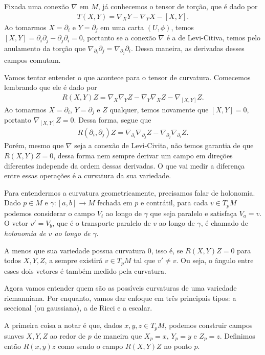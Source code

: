 \documentclass{article}
\begin{document}
Fixada uma conexão $\nabla$ em $M$, já conhecemos o tensor de torção, que é dado por \begin{align}
    T(X,Y) = \nabla_X Y - \nabla_Y X - [X,Y].
\end{align} Ao tomarmos $X = \partial_i$ e $Y = \partial_j$ em uma carta $(U, \phi)$, temos $[X,Y] = \partial_i \partial_j - \partial_j \partial_i = 0$, portanto se a conexão $\nabla$ é a de Levi-Citiva, temos pelo anulamento da torção que $\nabla_{\partial_i} \partial_j = \nabla_{\partial_j} \partial_i$. Dessa maneira, as derivadas desses campos comutam.

Vamos tentar entender o que acontece para o tensor de curvatura. Comecemos lembrando que ele é dado por \begin{align}
    R(X,Y)Z = \nabla_X\nabla_Y Z - \nabla_Y\nabla_X Z - \nabla_{[X,Y]}Z.
\end{align} Ao tomarmos $X = \partial_i$, $Y = \partial_j$ e $Z$ qualquer, temos novamente que $[X,Y] = 0$, portanto $\nabla_{[X,Y]}Z = 0$. Dessa forma, segue que \begin{align}
    R(\partial_i, \partial_j)Z = \nabla_{\partial_i}\nabla_{\partial_j}Z - \nabla_{\partial_j}\nabla_{\partial_i}Z.
\end{align} Porém, mesmo que $\nabla$ seja a conexão de Levi-Civita, não temos garantia de que $R(X,Y)Z = 0$, dessa forma nem sempre derivar um campo em direções diferentes independe da ordem dessas derivadas. O que vai medir a diferença entre essas operações é a curvatura da sua variedade.

Para entendermos a curvatura geometricamente, precisamos falar de holonomia. Dado $p \in M$ e $\gamma \colon [a,b] \to M$ fechada em $p$ e contrátil, para cada $v \in T_pM$ podemos considerar o campo $V_t$ ao longo de $\gamma$ que seja paralelo e satisfaça $V_a = v$. O vetor $v' = V_b$, que é o transporte paralelo de $v$ ao longo de $\gamma$, é chamado de \textit{holonomia de $v$ ao longo de $\gamma$}.

A menos que sua variedade possua curvatura $0$, isso é, se $R(X,Y)Z = 0$ para todos $X, Y, Z$, a sempre existirá $v \in T_pM$ tal que $v' \neq v$. Ou seja, o ângulo entre esses dois vetores é também medido pela curvatura.

Agora vamos entender quem são as possíveis curvaturas de uma variedade riemanniana. Por enquanto, vamos dar enfoque em três principais tipos: a seccional (ou gaussiana), a de Ricci e a escalar.

A primeira coisa a notar é que, dados $x, y, z \in T_pM$, podemos construir campos suaves $X, Y, Z$ ao redor de $p$ de maneira que $X_p = x$, $Y_p = y$ e $Z_p = z$. Definimos então $R(x,y)z$ como sendo o campo $R(X, Y)Z$ no ponto $p$.
\end{document}
